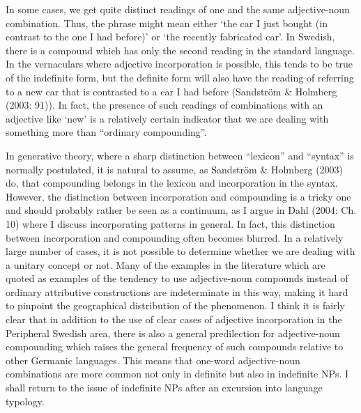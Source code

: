 In some cases, we get quite distinct readings of one and the same adjective-noun combination. Thus, the phrase  might mean either ‘the car I just bought (in contrast to the one I had before)’ or ‘the recently fabricated car’. In Swedish, there is a compound  which has only the second reading in the standard language. In the vernaculars where adjective incorporation is possible, this tends to be true of the indefinite form, but the definite form will also have the reading of referring to a new car that is contrasted to a car I had before (Sandström \& Holmberg (2003: 91)). In fact, the presence of such readings of combinations with an adjective like ‘new’ is a relatively certain indicator that we are dealing with something more than “ordinary compounding”.

In generative theory, where a sharp distinction between “lexicon” and “syntax” is normally postulated, it is natural to assume, as Sandström \& Holmberg (2003) do, that compounding belongs in the lexicon and incorporation in the syntax. However, the distinction between incorporation and compounding is a tricky one and should probably rather be seen as a continuum, as I argue in Dahl (2004: Ch. 10) where I discuss incorporating patterns in general. In fact, this distinction between incorporation and compounding often becomes blurred. In a relatively large number of cases, it is not possible to determine whether we are dealing with a unitary concept or not. Many of the examples in the literature which are quoted as examples of the tendency to use adjective-noun compounds instead of ordinary attributive constructions are indeterminate in this way, making it hard to pinpoint the geographical distribution of the phenomenon. I think it is fairly clear that in addition to the use of clear cases of adjective incorporation in the Peripheral Swedish area, there is also a general predilection for adjective-noun compounding which raises the general frequency of such compounds relative to other Germanic languages. This means that one-word adjective-noun combinations are more common not only in definite but also in indefinite NPs. I shall return to the issue of indefinite NPs after an excursion into language typology.

